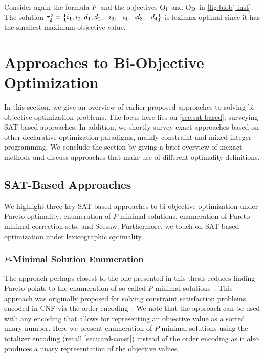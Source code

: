 \begin{example}
  Consider again the formula $F$ and the objectives $\textsc{O}_{\text{I}}$ and $\textsc{O}_{\text{D}}$ in \cref{fig:biobj-inst}.
  The solution $\tau^o_2 = \{i_1,\allowbreak i_2,\allowbreak d_1,\allowbreak d_2,\allowbreak \lnot i_3,\allowbreak \lnot i_4,\allowbreak \lnot d_3,\allowbreak \lnot d_4\}$ is leximax-optimal since it has the smallest maximum objective value.
\end{example}

\section{Approaches to Bi-Objective Optimization\label{sec:approaches}}

In this section, we give an overview of earlier-proposed approaches to solving bi-objective optimization problems.
The focus here lies on \cref{sec:sat-based}, surveying SAT-based approaches.
In addition, we shortly survey exact approaches based on other declarative optimization paradigms, mainly constraint and mixed integer programming.
We conclude the section by giving a brief overview of inexact methods and discuss approaches that make use of different optimality definitions.

\subsection{SAT-Based Approaches\label{sec:sat-based}}

We highlight three key SAT-based approaches to bi-objective optimization under Pareto optimality:
enumeration of $P$-minimal solutions, enumeration of Pareto-minimal correction sets, and Seesaw.
Furthermore, we touch on SAT-based optimization under lexicographic optimality.

\subsubsection{$P$-Minimal Solution Enumeration\label{sec:p-minimal}}

The approach perhaps closest to the one presented in this thesis reduces finding Pareto points to the enumeration of so-called $P$-minimal solutions~\autocites{DBLP:conf/cp/SohBTB17,DBLP:conf/ftp/KoshimuraNFH09}.
This approach was originally proposed for solving constraint satisfaction problems~\autocites{DBLP:reference/fai/2} encoded in CNF via the order encoding~\autocite{DBLP:conf/ictai/TamuraBS13}.
We note that the approach can be used with any encoding that allows for representing an objective value as a sorted unary number.
Here we present enumeration of $P$-minimal solutions using the totalizer encoding (recall \cref{sec:card-const}) instead of the order encoding as it also produces a unary representation of the objective values.

